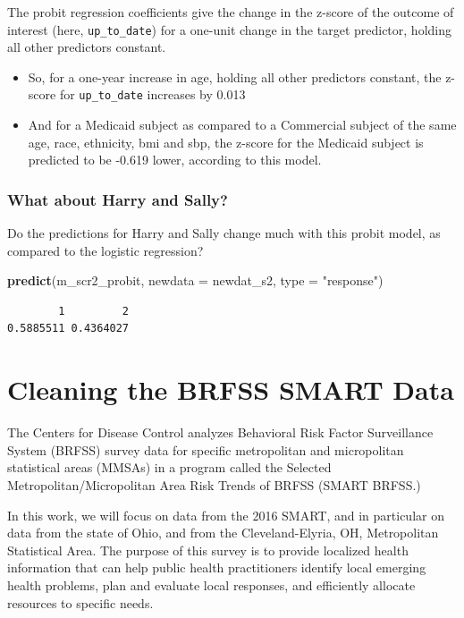 \documentclass[]{book}
\newenvironment{Shaded}{\begin{snugshade}}{\end{snugshade}}
\newcommand{\KeywordTok}[1]{\textcolor[rgb]{0.13,0.29,0.53}{\textbf{#1}}}
\newcommand{\DataTypeTok}[1]{\textcolor[rgb]{0.13,0.29,0.53}{#1}}
\newcommand{\StringTok}[1]{\textcolor[rgb]{0.31,0.60,0.02}{#1}}
\newcommand{\NormalTok}[1]{#1}
\providecommand{\tightlist}{%
  \setlength{\itemsep}{0pt}\setlength{\parskip}{0pt}}
\theoremstyle{definition}
\theoremstyle{definition}
\theoremstyle{definition}
\theoremstyle{remark}
\begin{document}
The probit regression coefficients give the change in the z-score of the
outcome of interest (here, \texttt{up\_to\_date}) for a one-unit change
in the target predictor, holding all other predictors constant.

\begin{itemize}
\tightlist
\item
  So, for a one-year increase in age, holding all other predictors
  constant, the z-score for \texttt{up\_to\_date} increases by 0.013
\item
  And for a Medicaid subject as compared to a Commercial subject of the
  same age, race, ethnicity, bmi and sbp, the z-score for the Medicaid
  subject is predicted to be -0.619 lower, according to this model.
\end{itemize}

\subsection{What about Harry and
Sally?}\label{what-about-harry-and-sally}

Do the predictions for Harry and Sally change much with this probit
model, as compared to the logistic regression?

\begin{Shaded}
\begin{Highlighting}[]
\KeywordTok{predict}\NormalTok{(m_scr2_probit, }\DataTypeTok{newdata =}\NormalTok{ newdat_s2, }\DataTypeTok{type =} \StringTok{"response"}\NormalTok{)}
\end{Highlighting}
\end{Shaded}

\begin{verbatim}
        1         2 
0.5885511 0.4364027 
\end{verbatim}

\chapter{Cleaning the BRFSS SMART
Data}\label{cleaning-the-brfss-smart-data}

The Centers for Disease Control analyzes Behavioral Risk Factor
Surveillance System (BRFSS) survey data for specific metropolitan and
micropolitan statistical areas (MMSAs) in a program called the Selected
Metropolitan/Micropolitan Area Risk Trends of BRFSS (SMART BRFSS.)

In this work, we will focus on data from the 2016 SMART, and in
particular on data from the state of Ohio, and from the
Cleveland-Elyria, OH, Metropolitan Statistical Area. The purpose of this
survey is to provide localized health information that can help public
health practitioners identify local emerging health problems, plan and
evaluate local responses, and efficiently allocate resources to specific
needs.
\end{document}
